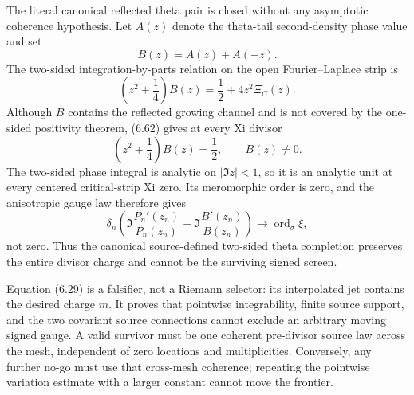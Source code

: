 \documentclass[11pt]{article}
\theoremstyle{definition}
\theoremstyle{remark}
\begin{document}
The literal canonical reflected theta pair is closed without any asymptotic coherence hypothesis.
Let $A(z)$ denote the theta-tail second-density phase value and set
\[
 B(z)=A(z)+A(-z).
\]
The two-sided integration-by-parts relation on the open Fourier--Laplace strip is
\[
 \left(z^2+\frac14\right)B(z)
 =\frac12+4z^2\Xi_C(z).                                \tag{6.62}
\]
Although $B$ contains the reflected growing channel and is not covered by the one-sided
positivity theorem, (6.62) gives at every Xi divisor
\[
 \left(z^2+\frac14\right)B(z)=\frac12,
 \qquad B(z)\ne0.                                      \tag{6.63}
\]
The two-sided phase integral is analytic on $|\Im z|<1$, so it is an analytic unit at every
centered critical-strip Xi zero.  Its meromorphic order is zero, and the anisotropic gauge law
therefore gives
\[
 \delta_n\left(
 \Im\frac{P_n'(z_n)}{P_n(z_n)}
 -\Im\frac{B'(z_n)}{B(z_n)}
 \right)
 \longrightarrow \operatorname{ord}_\sigma\xi ,
                                                               \tag{6.64}
\]
not zero.  Thus the canonical source-defined two-sided theta completion preserves the entire
divisor charge and cannot be the surviving signed screen.

Equation (6.29) is a falsifier, not a Riemann selector: its interpolated jet contains the desired
charge $m$.  It proves that pointwise integrability, finite source support, and the two covariant
source connections cannot exclude an arbitrary moving signed gauge.  A valid survivor must be one
coherent pre-divisor source law across the mesh, independent of zero locations and
multiplicities.  Conversely, any further no-go must use that cross-mesh coherence; repeating the
pointwise variation estimate with a larger constant cannot move the frontier.
\end{document}
